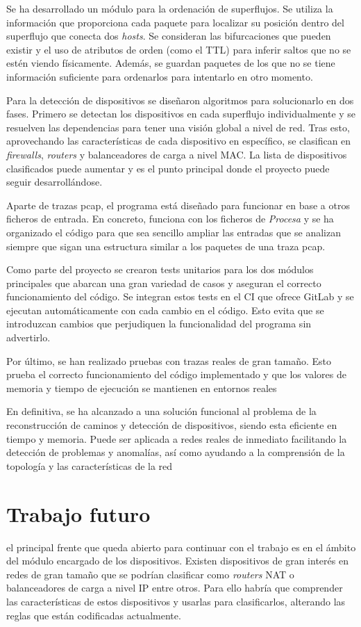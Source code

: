 \documentclass[tfg,epsbased,lof,lot,loa,final,nocopyright,overleaf]{tfgtfmthesisuam}
\begin{document}
Se ha desarrollado un módulo para la ordenación de superflujos. Se utiliza la información que proporciona cada paquete para localizar su posición dentro del superflujo que conecta dos \textit{hosts}. Se consideran las bifurcaciones que pueden existir y el uso de atributos de orden (como el TTL) para inferir saltos que no se estén viendo físicamente. Además, se guardan paquetes de los que no se tiene información suficiente para ordenarlos para intentarlo en otro momento.

Para la detección de dispositivos se diseñaron algoritmos para solucionarlo en dos fases. Primero se detectan los dispositivos en cada superflujo individualmente y se resuelven las dependencias para tener una visión global a nivel de red. Tras esto, aprovechando las características de cada dispositivo en específico, se clasifican en \textit{firewalls}, \textit{routers} y balanceadores de carga a nivel MAC. La lista de dispositivos clasificados puede aumentar y es el punto principal donde el proyecto puede seguir desarrollándose.

Aparte de trazas pcap, el programa está diseñado para funcionar en base a otros ficheros de entrada. En concreto, funciona con los ficheros de \textit{Procesa} y se ha organizado el código para que sea sencillo ampliar las entradas que se analizan siempre que sigan una estructura similar a los paquetes de una traza pcap.

Como parte del proyecto se crearon tests unitarios para los dos módulos principales que abarcan una gran variedad de casos y aseguran el correcto funcionamiento del código. Se integran estos tests en el CI que ofrece GitLab y se ejecutan automáticamente con cada cambio en el código. Esto evita que se introduzcan cambios que perjudiquen la funcionalidad del programa sin advertirlo.

Por último, se han realizado pruebas con trazas reales de gran tamaño. Esto prueba el correcto funcionamiento del código implementado y que los valores de memoria y tiempo de ejecución se mantienen en entornos reales

En definitiva, se ha alcanzado a una solución funcional al problema de la reconstrucción de caminos y detección de dispositivos, siendo esta eficiente en tiempo y memoria. Puede ser aplicada a redes reales de inmediato facilitando la detección de problemas y anomalías, así como ayudando a la comprensión de la topología y las características de la red

\section{Trabajo futuro}
el principal frente que queda abierto para continuar con el trabajo es en el ámbito del módulo encargado de los dispositivos. Existen dispositivos de gran interés en redes de gran tamaño que se podrían clasificar como \textit{routers} NAT o balanceadores de carga a nivel IP entre otros. Para ello habría que comprender las características de estos dispositivos y usarlas para clasificarlos, alterando las reglas que están codificadas actualmente.
\end{document}
